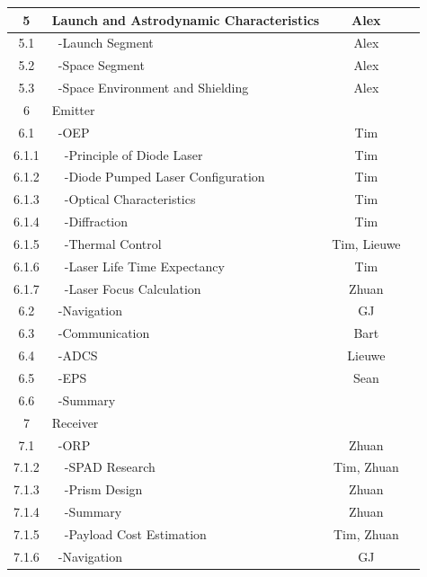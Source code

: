 \begin{table}[ht!]
{\begin{tabular}{|c|l|c|c|}
 5       & Launch and Astrodynamic Characteristics & Alex &\\\hline
 5.1     & \ -Launch Segment                    & Alex &\\\hline
 5.2     & \ -Space Segment                     & Alex &\\\hline
 5.3     & \ -Space Environment and Shielding   & Alex &\\\hline\hline
 6       & Emitter                              &\\\hline
 6.1     & \ -OEP                               & Tim &\\\hline
 6.1.1   & \ \ -Principle of Diode Laser       & Tim &\\\hline
 6.1.2   & \ \ -Diode Pumped Laser Configuration & Tim &\\\hline
 6.1.3   & \ \ -Optical Characteristics        & Tim &\\\hline
 6.1.4   & \ \ -Diffraction                    & Tim &\\\hline  
 6.1.5   & \ \ -Thermal Control                & Tim, Lieuwe &\\\hline
 6.1.6   & \ \ -Laser Life Time Expectancy     & Tim &\\\hline
 6.1.7   & \ \ -Laser Focus Calculation        & Zhuan &\\\hline
 6.2     & \ -Navigation                        & GJ &\\\hline
 6.3     & \ -Communication                     & Bart &\\\hline
 6.4     & \ -ADCS                              & Lieuwe &\\\hline
 6.5     & \ -EPS                               & Sean &\\\hline
 6.6     & \ -Summary                           &\\\hline\hline
 7       & Receiver                             &\\\hline
 7.1     & \ -ORP                               & Zhuan &\\\hline
 7.1.2   & \ \ -SPAD Research                  & Tim, Zhuan &\\\hline
 7.1.3   & \ \ -Prism Design                   & Zhuan &\\\hline
 7.1.4   & \ \ -Summary                        & Zhuan &\\\hline
 7.1.5   & \ \ -Payload Cost Estimation        & Tim, Zhuan &\\\hline
 7.1.6   & \ -Navigation                        & GJ &\\\hline

\end{tabular}}
\end{table}
